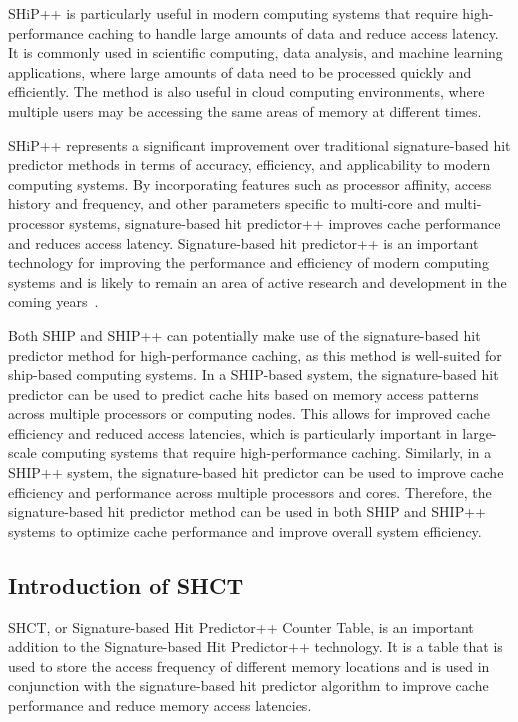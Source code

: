 SHiP++ is particularly useful in modern computing systems that require high-performance caching to handle large amounts of data and reduce access latency. It is commonly used in scientific computing, data analysis, and machine learning applications, where large amounts of data need to be processed quickly and efficiently. The method is also useful in cloud computing environments, where multiple users may be accessing the same areas of memory at different times.\par

SHiP++ represents a significant improvement over traditional signature-based hit predictor methods in terms of accuracy, efficiency, and applicability to modern computing systems\cite{Young2017}. By incorporating features such as processor affinity, access history and frequency, and other parameters specific to multi-core and multi-processor systems, signature-based hit predictor++ improves cache performance and reduces access latency. Signature-based hit predictor++ is an important technology for improving the performance and efficiency of modern computing systems and is likely to remain an area of active research and development in the coming years~\cite{Dong}.\par
Both SHIP and SHIP++ can potentially make use of the signature-based hit predictor method for high-performance caching, as this method is well-suited for ship-based computing systems.\cite{Haiming} In a SHIP-based system, the signature-based hit predictor can be used to predict cache hits based on memory access patterns across multiple processors or computing nodes. This allows for improved cache efficiency and reduced access latencies, which is particularly important in large-scale computing systems that require high-performance caching.\cite{Robust,Santosh,Song} Similarly, in a SHIP++ system, the signature-based hit predictor can be used to improve cache efficiency and performance across multiple processors and cores.\cite{wecon} Therefore, the signature-based hit predictor method can be used in both SHIP and SHIP++ systems to optimize cache performance and improve overall system efficiency.

\subsection{Introduction of SHCT}
SHCT, or Signature-based Hit Predictor++ Counter Table, is an important addition to the Signature-based Hit Predictor++ technology. It is a table that is used to store the access frequency of different memory locations and is used in conjunction with the signature-based hit predictor algorithm to improve cache performance and reduce memory access latencies.

